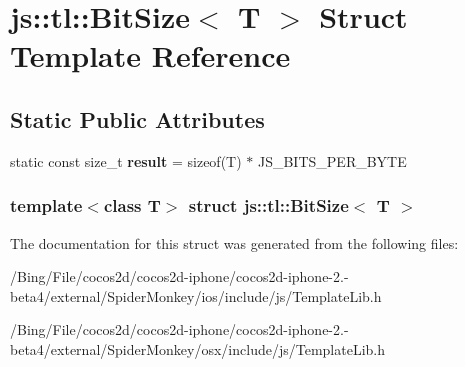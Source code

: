 \hypertarget{structjs_1_1tl_1_1_bit_size}{\section{js\-:\-:tl\-:\-:Bit\-Size$<$ T $>$ Struct Template Reference}
\label{structjs_1_1tl_1_1_bit_size}
}
\subsection*{Static Public Attributes}
\begin{DoxyCompactItemize}
\item 
\hypertarget{structjs_1_1tl_1_1_bit_size_a1393b51468717202b5c3bc2d7cac31a6}{static const size\-\_\-t {\bfseries result} = sizeof(T) $\ast$ J\-S\-\_\-\-B\-I\-T\-S\-\_\-\-P\-E\-R\-\_\-\-B\-Y\-T\-E}\label{structjs_1_1tl_1_1_bit_size_a1393b51468717202b5c3bc2d7cac31a6}

\end{DoxyCompactItemize}
\subsubsection*{template$<$class T$>$ struct js\-::tl\-::\-Bit\-Size$<$ T $>$}



The documentation for this struct was generated from the following files\-:\begin{DoxyCompactItemize}
\item 
/\-Bing/\-File/cocos2d/cocos2d-\/iphone/cocos2d-\/iphone-\/2.-\/beta4/external/\-Spider\-Monkey/ios/include/js/Template\-Lib.\-h\item 
/\-Bing/\-File/cocos2d/cocos2d-\/iphone/cocos2d-\/iphone-\/2.-\/beta4/external/\-Spider\-Monkey/osx/include/js/Template\-Lib.\-h\end{DoxyCompactItemize}
